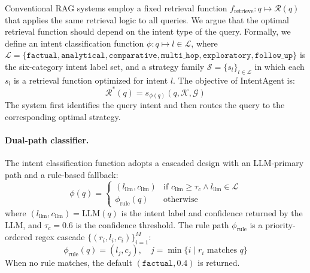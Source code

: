 \documentclass[runningheads]{llncs}
\begin{document}
Conventional RAG systems employ a fixed retrieval function $f_{\text{retrieve}}: q \mapsto \mathcal{R}(q)$ that applies the same retrieval logic to all queries. We argue that the optimal retrieval function should depend on the intent type of the query. Formally, we define an intent classification function $\phi: q \mapsto l \in \mathcal{L}$, where $\mathcal{L} = \{\texttt{factual}, \texttt{analytical}, \texttt{comparative}, \texttt{multi\_hop}, \texttt{exploratory}, \texttt{follow\_up}\}$ is the six-category intent label set, and a strategy family $\mathcal{S} = \{s_l\}_{l \in \mathcal{L}}$ in which each $s_l$ is a retrieval function optimized for intent $l$. The objective of IntentAgent is:
\begin{equation}
    \mathcal{R}^*(q) = s_{\phi(q)}(q, \mathcal{K}, \mathcal{G})
\end{equation}
The system first identifies the query intent and then routes the query to the corresponding optimal strategy.

\paragraph{Dual-path classifier.}
The intent classification function adopts a cascaded design with an LLM-primary path and a rule-based fallback:
\begin{equation}
    \phi(q) = \begin{cases}
    (l_{\text{llm}}, c_{\text{llm}}) & \text{if } c_{\text{llm}} \geq \tau_c \wedge l_{\text{llm}} \in \mathcal{L} \\
    \phi_{\text{rule}}(q) & \text{otherwise}
    \end{cases}
\end{equation}
where $(l_{\text{llm}}, c_{\text{llm}}) = \text{LLM}(q)$ is the intent label and confidence returned by the LLM, and $\tau_c = 0.6$ is the confidence threshold. The rule path $\phi_{\text{rule}}$ is a priority-ordered regex cascade $\{(r_i, l_i, c_i)\}_{i=1}^{M}$:
\begin{equation}
    \phi_{\text{rule}}(q) = (l_j, c_j), \quad j = \min\{i \mid r_i \text{ matches } q\}
\end{equation}
When no rule matches, the default $(\texttt{factual}, 0.4)$ is returned.
\end{document}
